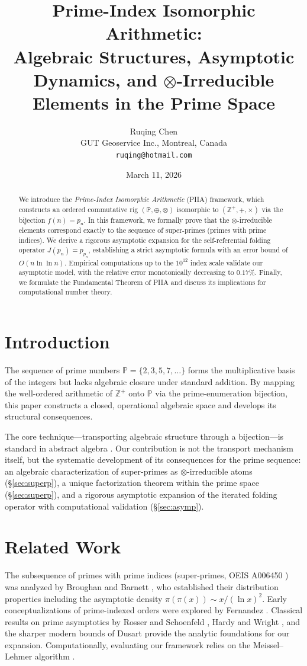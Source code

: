 \documentclass[11pt, a4paper]{article}
\title{\textbf{Prime-Index Isomorphic Arithmetic: \\ Algebraic Structures, Asymptotic Dynamics, and $\otimes$-Irreducible Elements in the Prime Space}}
\author{Ruqing Chen \\ \small GUT Geoservice Inc., Montreal, Canada \\ \small \texttt{ruqing@hotmail.com}}
\date{March 11, 2026}
\begin{document}
\maketitle

\begin{abstract}
We introduce the \textit{Prime-Index Isomorphic Arithmetic} (PIIA) framework, which constructs an ordered commutative rig $({\mathbb{P}}, \oplus, \otimes)$ isomorphic to $(\mathbb{Z}^+, +, \times)$ via the bijection $f(n) = p_n$. In this framework, we formally prove that the $\otimes$-irreducible elements correspond exactly to the sequence of super-primes (primes with prime indices). We derive a rigorous asymptotic expansion for the self-referential folding operator $J(p_n) = p_{p_n}$, establishing a strict asymptotic formula with an error bound of $O(n \ln \ln n)$. Empirical computations up to the $10^{12}$ index scale validate our asymptotic model, with the relative error monotonically decreasing to $0.17\%$. Finally, we formulate the Fundamental Theorem of PIIA and discuss its implications for computational number theory.
\end{abstract}

\section{Introduction}
The sequence of prime numbers $\mathbb{P} = \{2, 3, 5, 7, \dots\}$ forms the multiplicative basis of the integers but lacks algebraic closure under standard addition. By mapping the well-ordered arithmetic of $\mathbb{Z}^+$ onto $\mathbb{P}$ via the prime-enumeration bijection, this paper constructs a closed, operational algebraic space and develops its structural consequences.

The core technique---transporting algebraic structure through a bijection---is standard in abstract algebra \cite{lang}. Our contribution is not the transport mechanism itself, but the systematic development of its consequences for the prime sequence: an algebraic characterization of super-primes as $\otimes$-irreducible atoms (\S\ref{sec:superp}), a unique factorization theorem within the prime space (\S\ref{sec:superp}), and a rigorous asymptotic expansion of the iterated folding operator with computational validation (\S\ref{sec:asymp}).

\section{Related Work}
The subsequence of primes with prime indices (super-primes, OEIS A006450 \cite{oeis}) was analyzed by Broughan and Barnett \cite{broughan}, who established their distribution properties including the asymptotic density $\pi(\pi(x)) \sim x / (\ln x)^2$. Early conceptualizations of prime-indexed orders were explored by Fernandez \cite{fernandez}. Classical results on prime asymptotics by Rosser and Schoenfeld \cite{rosser}, Hardy and Wright \cite{hardy}, and the sharper modern bounds of Dusart \cite{dusart} provide the analytic foundations for our expansion. Computationally, evaluating our framework relies on the Meissel--Lehmer algorithm \cite{lagarias}.
\end{document}
